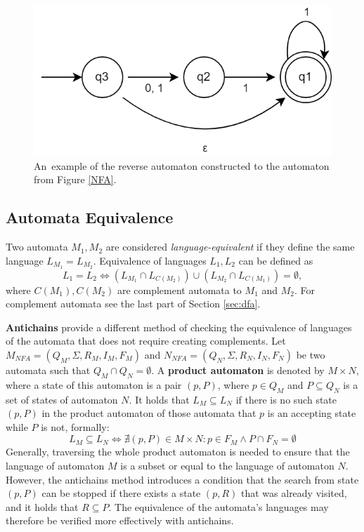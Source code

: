 \begin{figure}[ht]
    \label{fig:rev_auto}
    \centering
    \includegraphics[width=0.5\linewidth]{obrazky-figures/reverse_auto.png}
    \caption{An~example of the reverse automaton constructed to the automaton from Figure \ref{NFA}.}
\end{figure}

\subsection*{Automata Equivalence}
Two automata $M_1, M_2$ are considered \textit{language-equivalent} if they define the same language $L_{M_1} = L_{M_2}$. Equivalence of languages $L_1, L_2$ can be defined as
\begin{equation*}
    L_1 = L_2 \iff (L_{M_1} \cap L_{C(M_{2})}) \cup (L_{M_2} \cap L_{C(M_{1})}) = \emptyset,
\end{equation*} where $C(M_{1}), C(M_{2})$ are complement automata to $M_1$ and $M_2$. For complement automata see the last part of Section \ref{sec:dfa}.

\textbf{Antichains} provide a different method of checking the equivalence of languages of the automata that does not require creating complements. Let ${M_{NFA}=(Q_M,\Sigma, R_M, I_M, F_M)}$ and ${N_{NFA}=(Q_N,\Sigma, R_N, I_N, F_N)}$ be two automata such that $Q_M \cap Q_N = \emptyset$. A \textbf{product automaton} is denoted by $M\times N$, where a state of this automaton is a pair $(p, P)$, where $p \in Q_M$ and $P \subseteq Q_N$ is a set of states of automaton $N$. It holds that $L_M \subseteq L_N$ if there is no such state $(p, P)$ in the product automaton of those automata that $p$ is an accepting state while $P$ is not, formally:
\begin{equation*}
    L_M \subseteq L_N \iff \nexists (p, P) \in M\times N: p \in F_M \land P \cap F_N = \emptyset
\end{equation*}
Generally, traversing the whole product automaton is needed to ensure that the language of automaton $M$ is a subset or equal to the language of automaton $N$. However, the antichains method introduces a condition that the search from state $(p, P)$ can be stopped if there exists a state $(p, R)$ that was already visited, and it holds that $R \subseteq P$. The equivalence of the automata's languages may therefore be verified more effectively with antichains.

